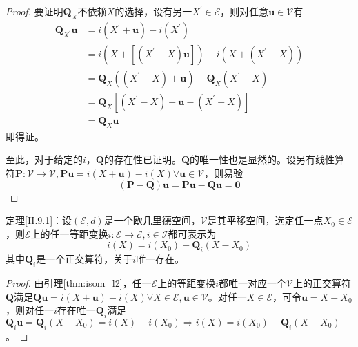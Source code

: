 \documentclass[main.tex]{subfiles}
\begin{document}
\begin{proof}
要证明$\mathbf{Q}_X$不依赖$X$的选择，设有另一$X^\prime\in\mathcal{E}$，则对任意$\mathbf{u}\in\mathcal{V}$有
\begin{align*}
\mathbf{Q}_{X^\prime}\mathbf{u}&=i\left(X^\prime+\mathbf{u}\right)-i\left(X^\prime\right)\\
&=i\left(X+\left[\left(X^\prime-X\right)\mathbf{u}\right]\right)-i\left(X+\left(X^\prime-X\right)\right)\\
&=\mathbf{Q}_X\left(\left(X^\prime-X\right)+\mathbf{u}\right)-\mathbf{Q}_X\left(X^\prime-X\right)\\
&=\mathbf{Q}_X\left[\left(X^\prime-X\right)+\mathbf{u}-\left(X^\prime-X\right)\right]\\
&=\mathbf{Q}_X\mathbf{u}
\end{align*}
即得证。

至此，对于给定的$i$，$\mathbf{Q}$的存在性已证明。$\mathbf{Q}$的唯一性也是显然的。设另有线性算符$\mathbf{P}:\mathcal{V}\rightarrow\mathcal{V},\mathbf{P}\mathbf{u}=i\left(X+\mathbf{u}\right)-i\left(X\right)\forall\mathbf{u}\in\mathcal{V}$，则易验
\[
\left(\mathbf{P}-\mathbf{Q}\right)\mathbf{u}=\mathbf{Pu}-\mathbf{Qu}=\mathbf{0}
\]
\end{proof}
\begin{theorem*}[等距变换的表示定理]
定理\ref{II.9.1}：设$\left(\mathcal{E},d\right)$是一个欧几里德空间，$\mathcal{V}$是其平移空间，选定任一点$X_0\in\mathcal{E}$，则$\mathcal{E}$上的任一等距变换$i:\mathcal{E}\rightarrow\mathcal{E},i\in\mathcal{I}$都可表示为
\[
i\left(X\right)=i\left(X_0\right)+\mathbf{Q}_i\left(X-X_0\right)
\]
其中$\mathbf{Q}_i$是一个正交算符，关于$i$唯一存在。
\end{theorem*}
\begin{proof}
由引理\ref{thm:isom_l2}，任一$\mathcal{E}$上的等距变换$i$都唯一对应一个$\mathcal{V}$上的正交算符$\mathbf{Q}$满足$\mathbf{Qu}=i\left(X+\mathbf{u}\right)-i\left(X\right)\forall X\in\mathcal{E},\mathbf{u}\in\mathcal{V}$。对任一$X\in\mathcal{E}$，可令$\mathbf{u}=X-X_0$，则对任一$i$存在唯一$\mathbf{Q}_i$满足$\mathbf{Q}_i\mathbf{u}=\mathbf{Q}_i\left(X-X_0\right)=i\left(X\right)-i\left(X_0\right)\Rightarrow i\left(X\right)=i\left(X_0\right)+\mathbf{Q}_i\left(X-X_0\right)$。
\end{proof}
\end{document}

